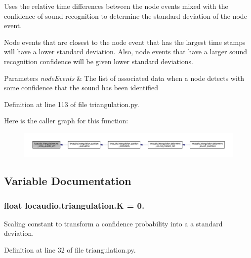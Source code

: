 Uses the relative time differences between the node events mixed with the confidence of sound recognition to determine the standard deviation of the node event. 

Node events that are closest to the node event that has the largest time stamps will have a lower standard deviation. Also, node events that have a larger sound recognition confidence will be given lower standard deviations.


\begin{DoxyParams}{Parameters}
{\em node\-Events} & The list of associated data when a node detects with some confidence that the sound has been identified \\
\hline
\end{DoxyParams}


Definition at line 113 of file triangulation.\-py.



Here is the caller graph for this function\-:
\nopagebreak
\begin{figure}[H]
\begin{center}
\leavevmode
\includegraphics[width=350pt]{namespacelocaudio_1_1triangulation_ad44e1bed6beed7ee59cffc4c230f7144_icgraph}
\end{center}
\end{figure}




\subsection{Variable Documentation}
\hypertarget{namespacelocaudio_1_1triangulation_ac85bcbed961d15baa586ddc0192860bb}{
\subsubsection[{K}]{\setlength{\rightskip}{0pt plus 5cm}float locaudio.\-triangulation.\-K = 0.}}\label{namespacelocaudio_1_1triangulation_ac85bcbed961d15baa586ddc0192860bb}


Scaling constant to transform a confidence probability into a a standard deviation. 



Definition at line 32 of file triangulation.\-py.

